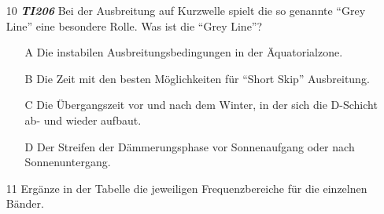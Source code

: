 \begin{enumerate} 
\itemsep1pt\parskip0pt
\item[10] \emph{\textbf{TI206}}   Bei der Ausbreitung auf Kurzwelle spielt die so genannte ``Grey Line'' eine besondere Rolle. Was ist die ``Grey Line''?
	\begin{enumerate}
	\itemsep1pt\parskip0pt
		\item[A] Die instabilen Ausbreitungsbedingungen in der Äquatorialzone.
		\item[B] Die Zeit mit den besten Möglichkeiten für ``Short Skip'' Ausbreitung.
		\item[C] Die Übergangszeit vor und nach dem Winter, in der sich die D-Schicht ab- und wieder aufbaut.
		\item[D] Der Streifen der Dämmerungsphase vor Sonnenaufgang oder nach Sonnenuntergang.
	\end{enumerate}
\end{enumerate}

\begin{enumerate} 
\itemsep1pt\parskip0pt
\item[11] Ergänze in der Tabelle die jeweiligen Frequenzbereiche für die einzelnen Bänder.
\end{enumerate}


\begin{figure}[H]
\end{figure}


